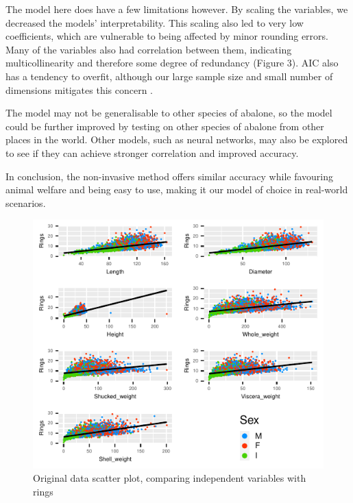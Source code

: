\documentclass[a4paper,9pt,twocolumn,twoside,]{pinp}
\begin{document}
The model here does have a few limitations however. By scaling the
variables, we decreased the models' interpretability. This scaling also
led to very low coefficients, which are vulnerable to being affected by
minor rounding errors. Many of the variables also had correlation
between them, indicating multicollinearity and therefore some degree of
redundancy (Figure 3). AIC also has a tendency to overfit, although our
large sample size and small number of dimensions mitigates this concern
\citep{hurvich}.

The model may not be generalisable to other species of abalone, so the
model could be further improved by testing on other species of abalone
from other places in the world. Other models, such as neural networks,
may also be explored to see if they can achieve stronger correlation and
improved accuracy.

In conclusion, the non-invasive method offers similar accuracy while
favouring animal welfare and being easy to use, making it our model of
choice in real-world scenarios.

\newpage

\begin{figure}

{\centering \includegraphics{005E06-Project-Report_files/figure-latex/original_scatter-1} 

}

\caption{Original data scatter plot, comparing independent variables with rings}\label{fig:original_scatter}
\end{figure}
\end{document}
